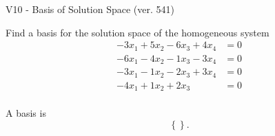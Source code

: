 \begin{exercise}
  \begin{exerciseTitle}V10 - Basis of Solution Space (ver. 541)\end{exerciseTitle}
  \begin{exerciseStatement}
    Find a basis for the solution space of the homogeneous system 
\begin{align*}
 -3 x_ 1 + 5 x_ 2 -6 x_ 3 + 4 x_ 4 &= 0  \\ 
  -6 x_ 1 -4 x_ 2 -1 x_ 3 -3 x_ 4 &= 0  \\ 
  -3 x_ 1 -1 x_ 2 -2 x_ 3 + 3 x_ 4 &= 0  \\ 
  -4 x_ 1 + 1 x_ 2 + 2 x_ 3 &= 0  \\ 
 \end{align*}


 
  \end{exerciseStatement}

  \begin{exerciseAnswer}
   A basis is   
\[\left\{\right\}.\]

  


  \end{exerciseAnswer}
\end{exercise}